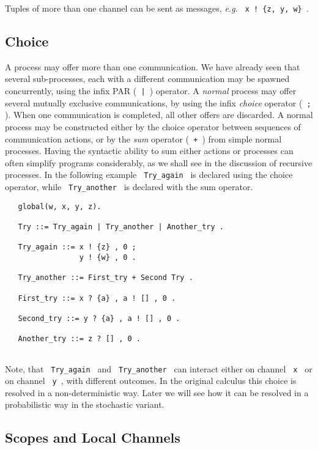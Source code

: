 \noindent
Tuples of more than one channel can be sent as messages, {\em e.g.}
\verb+ x ! {z, y, w} +. 

\subsection{Choice}

A process may offer more than one communication.  We have already seen
that several sub-processes, each with a different communication may
be spawned concurrently, using the infix PAR (\verb+ | +) operator. A
{\em normal} process may offer several mutually exclusive
communications, by using the infix {\em choice} operator (\verb+ ; +).  When
one communication is completed, all other offers are discarded.  A
normal process may be constructed either by the choice operator
between sequences of communication actions, or by the {\em sum}
operator (\verb- + -) from simple normal processes. Having the
syntactic ability to
sum either actions or processes can often simplify programs
considerably, as we shall see in the discussion of recursive processes.
In the following example \verb+ Try_again + is declared using the choice
operator, while \verb+ Try_another + is declared with the sum operator.


\begin{verbatim}
   global(w, x, y, z).

   Try ::= Try_again | Try_another | Another_try .

   Try_again ::= x ! {z} , 0 ;
                 y ! {w} , 0 .

   Try_another ::= First_try + Second Try .

   First_try ::= x ? {a} , a ! [] , 0 .

   Second_try ::= y ? {a} , a ! [] , 0 .

   Another_try ::= z ? [] , 0 .
 
\end{verbatim}

\noindent
Note, that \verb+ Try_again + and \verb+ Try_another + can interact
either on channel \verb+ x + or on channel \verb+ y +, with different
outcomes.  In the original calculus this choice is resolved in a
non-deterministic way.  Later we will see how it can be resolved in a
probabilistic way in the stochastic variant.

\subsection{Scopes and Local Channels}

